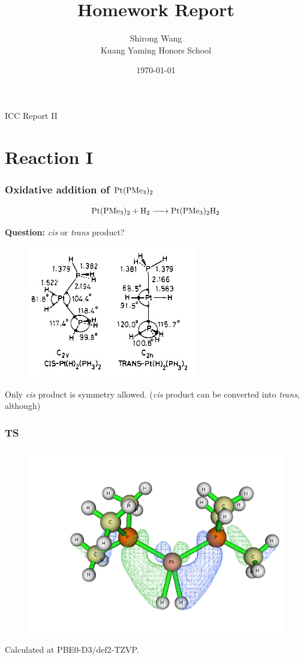 \documentclass[10pt,aspectratio=43,mathserif]{beamer}
\title{Homework Report}	        %
\author[]{            %
    Shirong Wang\\[0.3cm]
    Kuang Yaming Honors School}
\date{\today}
\begin{document}
\begin{frame}
\hfill ICC Report II\\
\titlepage
\end{frame}


\section{Reaction I}
\begin{frame}
\frametitle{Oxidative addition of $ \ce{Pt(PMe_3)_2} $}
\begin{equation}\label{key}
\ce{Pt(PMe_3)_2 + H_2 -> Pt(PMe_3)_2H_2}
\end{equation}

\end{frame}

\begin{frame}
\textbf{Question:} \textsl{cis} or \textsl{trans} product?\\

\begin{figure}[H]
	\includegraphics[width=0.45\linewidth]{Pt1.jpg}
\end{figure}
Only \textsl{cis} product is symmetry allowed. (\textsl{cis} product can be converted into \textsl{trans}, although)\\

\end{frame}

\begin{frame}
\frametitle{TS}
\begin{figure}
	\includegraphics[width=0.45\linewidth]{Pt_tsb_orb.png}
\end{figure}
Calculated at PBE0-D3/def2-TZVP.
\end{frame}
\end{document}
